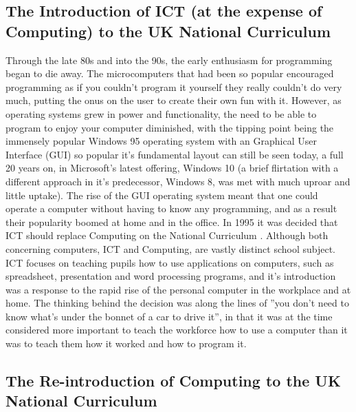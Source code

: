 \documentclass[ %
                    author={Jonathan Rankin},
                supervisor={Dr. David May, Dr. Ian Holyer},
                    degree={MEng},
                     title={CodeTouch},
                  subtitle={A Revolutionary Way To Program Real Code On Touch Screen Devices},
                      type={enterprise},
                      year={2015 } ]{dissertation}
\begin{document}
\subsection{The Introduction of ICT (at the expense of Computing) to the UK National Curriculum}
Through the late 80s and into the 90s, the early enthusiasm for programming began to die away. The microcomputers that had been so popular encouraged programming as if you couldn't program it yourself they really couldn't do very much, putting the onus on the user to create their own fun with it. However, as operating systems grew in power and functionality, the need to be able to program to enjoy your computer diminished, with the tipping point being the immensely popular Windows 95 operating system with an Graphical User Interface (GUI) so popular it's fundamental layout can still be seen today, a full 20 years on, in Microsoft's latest offering, Windows 10 (a brief flirtation with a different approach in it's predecessor, Windows 8, was met with much uproar and little uptake). The rise of the GUI operating system meant that one could operate a computer without having to know any programming, and as a result their popularity boomed at home and in the office. 
In 1995 it was decided that ICT should replace Computing on the National Curriculum \cite{ICTcurric}. Although both concerning computers, ICT and Computing, are vastly distinct school subject. ICT focuses on teaching pupils how to use applications on computers, such as spreadsheet, presentation and word processing programs, and it's introduction was a response to the rapid rise of the personal computer in the workplace and at home. The thinking behind the decision was along the lines of ''you don’t need to know what’s under the bonnet of a car to drive it'', in that it was at the time considered more important to teach the workforce how to use a computer than it was to teach them how it worked and how to program it. 
\subsection{The Re-introduction of Computing to the UK National Curriculum}
\end{document}
